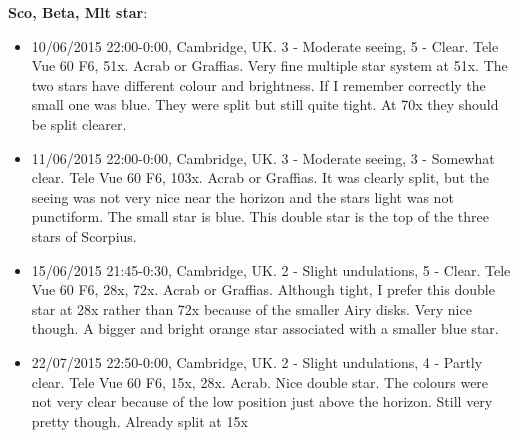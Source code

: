 {\bf Sco, Beta, Mlt star}:
\begin{itemize}
\item 10/06/2015 22:00-0:00, Cambridge, UK. 3 - Moderate seeing, 5 - Clear. Tele Vue 60 F6, 51x. Acrab or Graffias. Very fine multiple star system at 51x. The two stars have different colour and brightness. If I remember correctly the small one was blue. They were split but still quite tight. At 70x they should be split clearer. 
\item 11/06/2015 22:00-0:00, Cambridge, UK. 3 - Moderate seeing, 3 - Somewhat clear. Tele Vue 60 F6, 103x. Acrab or Graffias. It was clearly split, but the seeing was not very nice near the horizon and the stars light was not punctiform. The small star is blue. This double star is the top of the three stars of Scorpius.
\item 15/06/2015 21:45-0:30, Cambridge, UK. 2 - Slight undulations, 5 - Clear. Tele Vue 60 F6, 28x, 72x. Acrab or Graffias. Although tight, I prefer this double star at 28x rather than 72x because of the smaller Airy disks. Very nice though. A bigger and bright orange star associated with a smaller blue star. 
\item 22/07/2015 22:50-0:00, Cambridge, UK. 2 - Slight undulations, 4 - Partly clear. Tele Vue 60 F6, 15x, 28x. Acrab. Nice double star. The colours were not very clear because of the low position just above the horizon. Still very pretty though. Already split at 15x
\end{itemize}
